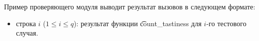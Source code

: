 Пример проверяющего модуля выводит результат вызовов в следующем формате:
\begin{itemize}
\item строка $i$ ($1 \leq i \leq q$): результат функции \t{count\_tastiness} для $i$-го тестового случая.
\end{itemize}
